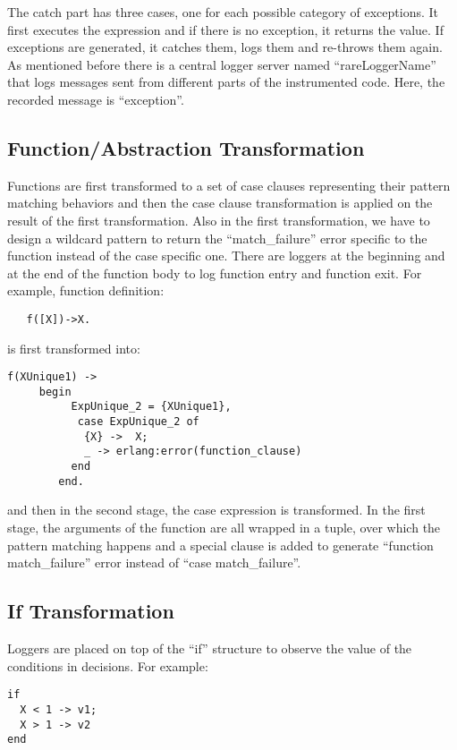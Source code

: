 \documentclass[12pt,a4paper]{report}
\begin{document}
The catch part has three cases, one for each possible category of exceptions. It first executes the expression and if there is no exception, it returns the value. If exceptions are generated, it catches them, logs them and re-throws them again. As mentioned before there is a central logger server named ``rareLoggerName'' that logs messages sent from different parts of the instrumented code. Here, the recorded message is ``exception''. 

\subsection{Function/Abstraction Transformation}
Functions are first transformed to a set of case clauses representing their pattern matching behaviors and then the case clause transformation is applied on the result of the first transformation. Also in the first transformation, we have to design a wildcard pattern to return the ``match\_failure'' error specific to the function instead of the case specific one. There are loggers at the beginning and at the end of the function body to log function entry and function exit. For example, function definition:

\begin{lstlisting}
   f([X])->X.
\end{lstlisting}

is first transformed into:

\begin{lstlisting}
f(XUnique1) ->
     begin
          ExpUnique_2 = {XUnique1},
           case ExpUnique_2 of
            {X} ->  X;
            _ -> erlang:error(function_clause)
          end
        end.
\end{lstlisting}

and then in the second stage, the case expression is transformed. In the first stage, the arguments of the function are all wrapped in a tuple, over which the pattern matching happens and a special clause is added to generate ``function match\_failure'' error instead of ``case match\_failure''.

\subsection{If Transformation}
Loggers are placed on top of the ``if'' structure to observe the value of the conditions in decisions. For example:

\begin{lstlisting}
if 
  X < 1 -> v1;
  X > 1 -> v2
end 
\end{lstlisting}
\end{document}
